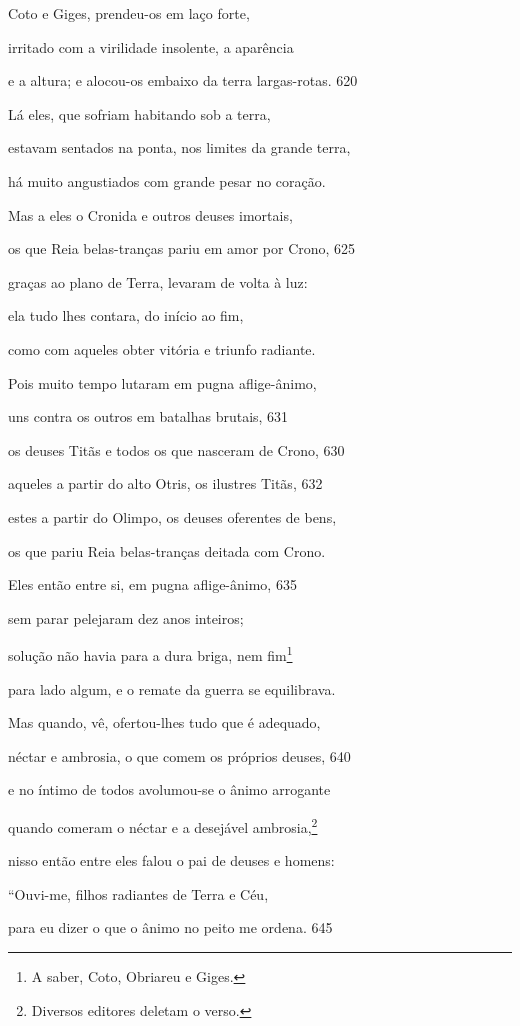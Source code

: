 Coto e Giges, prendeu-os em laço forte,

irritado com a virilidade insolente, a aparência

e a altura; e alocou-os embaixo da terra largas-rotas. \num{620}

Lá eles, que sofriam habitando sob a terra,

estavam sentados na ponta, nos limites da grande terra,

há muito angustiados com grande pesar no coração.

Mas a eles o Cronida e outros deuses imortais,

os que Reia belas-tranças pariu em amor por Crono, \num{625}

graças ao plano de Terra, levaram de volta à luz:

ela tudo lhes contara, do início ao fim,

como com aqueles obter vitória e triunfo radiante.

Pois muito tempo lutaram em pugna aflige-ânimo,

uns contra os outros em batalhas brutais, \num{631}

os deuses Titãs e todos os que nasceram de Crono, \num{630}

aqueles a partir do alto Otris, os ilustres Titãs, \num{632}

estes a partir do Olimpo, os deuses oferentes de bens,

os que pariu Reia belas-tranças deitada com Crono.

Eles então entre si, em pugna aflige-ânimo, \num{635}

sem parar pelejaram dez anos inteiros;

solução não havia para a dura briga, nem fim\footnote{A saber, Coto, Obriareu e Giges.}

para lado algum, e o remate da guerra se equilibrava.

\quad{}Mas quando, vê, ofertou-lhes tudo que é adequado,

néctar e ambrosia, o que comem os próprios deuses, \num{640}

e no íntimo de todos avolumou-se o ânimo arrogante

quando comeram o néctar e a desejável ambrosia,\footnote{Diversos editores deletam o verso.}

nisso então entre eles falou o pai de deuses e homens:

``Ouvi-me, filhos radiantes de Terra e Céu,

para eu dizer o que o ânimo no peito me ordena. \num{645}


